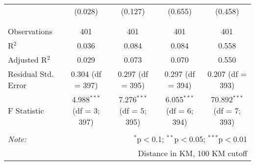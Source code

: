 \begin{table}[!htbp]
\begin{tabular}{@{\extracolsep{5pt}}lcccc}
  & (0.028) & (0.127) & (0.655) & (0.458) \\ 
  & & & & \\ 
\hline \\[-1.8ex] 
Observations & 401 & 401 & 401 & 401 \\ 
R$^{2}$ & 0.036 & 0.084 & 0.084 & 0.558 \\ 
Adjusted R$^{2}$ & 0.029 & 0.073 & 0.070 & 0.550 \\ 
Residual Std. Error & 0.304 (df = 397) & 0.297 (df = 395) & 0.297 (df = 394) & 0.207 (df = 393) \\ 
F Statistic & 4.988$^{***}$ (df = 3; 397) & 7.276$^{***}$ (df = 5; 395) & 6.055$^{***}$ (df = 6; 394) & 70.892$^{***}$ (df = 7; 393) \\ 
\hline 
\hline \\[-1.8ex] 
\textit{Note:}  & \multicolumn{4}{r}{$^{*}$p$<$0.1; $^{**}$p$<$0.05; $^{***}$p$<$0.01} \\ 
 & \multicolumn{4}{r}{Distance in KM, 100 KM cutoff} \\ 
\end{tabular} 
\end{table} 
